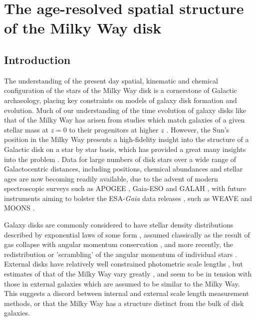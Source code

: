 \chapter{The age-resolved spatial structure of the Milky Way disk}

\section{Introduction}


The understanding of the present day spatial, kinematic and chemical configuration of the stars of the Milky Way disk is a cornerstone of Galactic archaeology, placing key constraints on models of galaxy disk formation and evolution. Much of our understanding of the time evolution of galaxy disks like that of the Milky Way has arisen from studies which match galaxies of a given stellar mass at $z=0$ to their progenitors at higher $z$ \citep[and therefore, lookback time, e.g. ][]{2013ApJ...771L..35V,2015ApJ...803...26P,2016MNRAS.462.4495H}. However, the Sun's position in the Milky Way presents a high-fidelity insight into the structure of a Galactic disk on a star by star basis, which has provided a great many insights into the problem \citep[e.g.][]{1962ApJ...136..748E,1993A&A...275..101E,2013A&A...560A.109H}. Data for large numbers of disk stars over a wide range of Galactocentric distances, including positions, chemical abundances and stellar ages are now becoming readily available, due to the advent of modern spectroscopic surveys such as APOGEE \citep{2015arXiv150905420M}, Gaia-ESO \citep{2012Msngr.147...25G} and GALAH \citep{2016arXiv160902822M}, with future instruments aiming to bolster the ESA-\emph{Gaia} data releases \citep{2016A&A...595A...1G}, such as WEAVE \citep{2014SPIE.9147E..0LD} and MOONS \citep{2012SPIE.8446E..0SC}.

Galaxy disks are commonly considered to have stellar density distributions described by exponential laws of some form \citep[e.g.][]{1959HDP....53..311D,1970ApJ...160..811F,1983MNRAS.202.1025G,2006A&A...454..759P}, assumed classically as the result of gas collapse with angular momentum conservation \citep[e.g.][]{1980MNRAS.193..189F}, and more recently, the redistribution or 'scrambling' of the angular momentum of individual stars \citep[e.g.][]{2013ApJ...775L..35E,2016ApJ...830..115E,2016arXiv161203171H}. External disks have relatively well constrained photometric scale lengths \citep[e.g.][]{2010MNRAS.406.1595F}, but estimates of that of the Milky Way vary greatly \citep[see][for a review]{2016ARA&A..54..529B}, and seem to be in tension with those in external galaxies which are assumed to be similar to the Milky Way. This suggests a discord between internal and external scale length measurement methods, or that the Milky Way has a structure distinct from the bulk of disk galaxies. 

